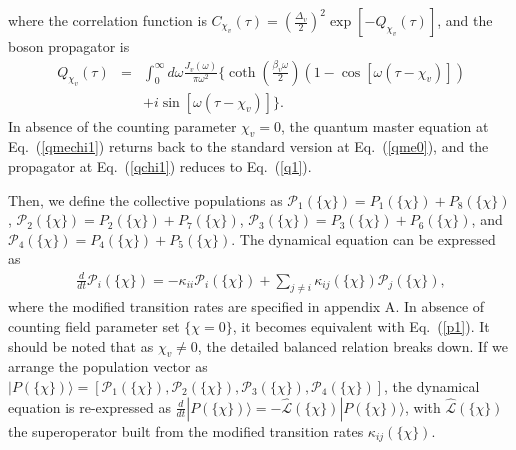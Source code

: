 \documentclass[twocolumn,preprintnumbers,amsmath,amssymb]{revtex4}
\begin{document}
where the correlation function is $C_{\chi_v}(\tau)=(\frac{\Delta_v}{2})^2\exp[-Q_{\chi_v}(\tau)]$, and the boson propagator is
\begin{eqnarray}~\label{qchi1}
Q_{\chi_v}(\tau)&=&\int^{\infty}_0d{\omega}\frac{J_v(\omega)}{\pi\omega^2}\{\coth(\frac{\beta_v\omega}{2})(1-\cos[\omega(\tau-\chi_v)])\nonumber\\
&&+i\sin[\omega(\tau-\chi_v)]\}.
\end{eqnarray}
In absence of the counting parameter $\chi_v=0$,
the quantum master equation at Eq.~(\ref{qmechi1}) returns back to the standard version at Eq.~(\ref{qme0}), and the propagator at Eq.~(\ref{qchi1}) reduces to Eq.~(\ref{q1}).

Then, we define the collective populations as
$\mathcal{P}_1(\{\chi\})=P_1(\{\chi\})+P_8(\{\chi\})$,
$\mathcal{P}_2(\{\chi\})=P_2(\{\chi\})+P_7(\{\chi\})$,
$\mathcal{P}_3(\{\chi\})=P_3(\{\chi\})+P_6(\{\chi\})$,
and $\mathcal{P}_4(\{\chi\})=P_4(\{\chi\})+P_5(\{\chi\})$.
The dynamical equation can be expressed as
\begin{eqnarray}~\label{qme1}
\frac{d}{dt}\mathcal{P}_i(\{\chi\})=-\kappa_{ii}\mathcal{P}_i(\{\chi\})+\sum_{j{\neq}i}\kappa_{ij}(\{\chi\})\mathcal{P}_j(\{\chi\}),
\end{eqnarray}
where the modified transition rates are specified in {\color{blue} appendix A}. In absence of counting field parameter set $\{\chi=0\}$, it becomes equivalent with Eq.~(\ref{p1}).
It should be noted that as $\chi_v{\neq}0$, the detailed balanced relation breaks down.
If we arrange the population vector as $|P(\{\chi\}){\rangle}=[\mathcal{P}_1(\{\chi\}),\mathcal{P}_2(\{\chi\}),\mathcal{P}_3(\{\chi\}),\mathcal{P}_4(\{\chi\})]$,
the dynamical equation is re-expressed as
$\frac{d}{dt}|P(\{\chi\}){\rangle}=-\mathcal{\hat{L}}(\{\chi\})|P(\{\chi\}){\rangle}$,
with $\mathcal{\hat{L}}(\{\chi\})$ the superoperator built from the modified transition rates $\kappa_{ij}(\{\chi\})$.
\end{document}

